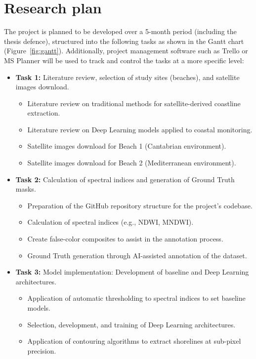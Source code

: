 \documentclass[ENG]{TFUOC}%
\begin{document}
\chapter{Research plan}
The project is planned to be developed over a 5-month period (including the thesis defence), structured into the following tasks as shown in the Gantt chart (Figure~\ref{fig:gantt}). Additionally, project management software such as Trello or MS Planner will be used to track and control the tasks at a more specific level:
\begin{itemize}
    \item \textbf{Task 1:} Literature review, selection of study sites (beaches), and satellite images download.
    \begin{itemize}
        \item Literature review on traditional methods for satellite-derived coastline extraction.
        \item Literature review on Deep Learning models applied to coastal monitoring.
        \item Satellite images download for Beach 1 (Cantabrian environment).
        \item Satellite images download for Beach 2 (Mediterranean environment).
    \end{itemize}
    \item \textbf{Task 2:} Calculation of spectral indices and generation of Ground Truth masks.
    \begin{itemize}
        \item Preparation of the GitHub repository structure for the project's codebase.
        \item Calculation of spectral indices (e.g., NDWI, MNDWI).
        \item Create false-color composites to assist in the annotation process.
        \item Ground Truth generation through AI-assisted annotation of the dataset.
    \end{itemize}
    \item \textbf{Task 3:} Model implementation: Development of baseline and Deep Learning architectures.
    \begin{itemize}
        \item Application of automatic thresholding to spectral indices to set baseline models.
        \item Selection, development, and training of Deep Learning architectures.
        \item Application of contouring algorithms to extract shorelines at sub-pixel precision.

\end{itemize}
\end{itemize}
\end{document}
